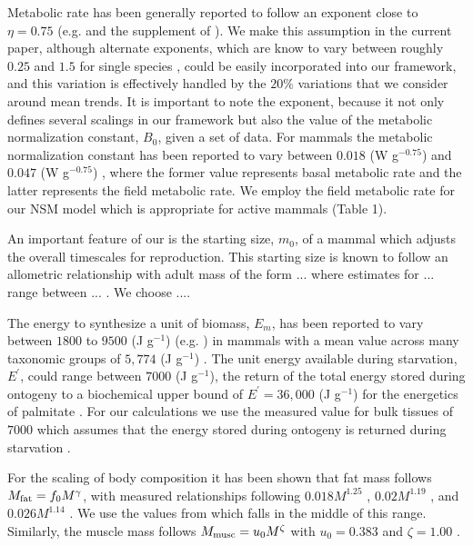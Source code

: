 \documentclass{pnastwo}
\begin{document}
\begin{article}
Metabolic rate has been generally reported to follow an exponent close to $\eta=0.75$ (e.g. \cite{West:2001bv,moses2008rmo} and the supplement of \cite{hou}). We make this assumption in the current paper, although alternate exponents, which are know to vary between roughly $0.25$ and $1.5$ for single species \cite{moses2008rmo}, could be easily incorporated into our framework, and this variation is effectively handled by the $20\%$ variations that we consider around mean trends. It is important to note the exponent, because it not only defines several scalings in our framework but also the value of the metabolic normalization constant, $B_{0}$, given a set of data.  For mammals the metabolic normalization constant has been reported to vary between $0.018$ (W g$^{-0.75}$) and $0.047$ (W g$^{-0.75}$) \cite{hou,West:2001bv}, where the former value represents basal metabolic rate and the latter represents the field metabolic rate. We employ the field metabolic rate for our NSM model which is appropriate for active mammals (Table 1).

An important feature of our is the starting size, $m_{0}$, of a mammal which adjusts the overall timescales for reproduction. This starting size is known to follow an allometric relationship with adult mass of the form ... where estimates for ... range between ... \cite{}. We choose ....

The energy to synthesize a unit of biomass, $E_{m}$, has been reported to vary between $1800$ to $9500$ (J g$^{-1}$) (e.g. \cite{West:2001bv,moses2008rmo,hou}) in mammals with a mean value across many taxonomic groups of $5,774$ (J g$^{-1}$) \cite{moses2008rmo}. The unit energy available during starvation, $E^{\prime}$, could range between $7000$ (J g$^{-1}$), the return of the total energy stored during ontogeny \cite{hou} to a biochemical upper bound of $E^{\prime}=36,000$ (J g$^{-1}$) for the energetics of palmitate \cite{stryer,hou}. For our calculations we use the measured value for bulk tissues of $7000$ which assumes that the energy stored during ontogeny is returned during starvation \cite{hou}.

For the scaling of body composition it has been shown that fat mass follows $M_{\rm fat}=f_{0}M^{\gamma}$, with measured  relationships following  $0.018M^{1.25}$ \cite{Dunbrack:1993ec}, $0.02M^{1.19}$ \cite{Lindstedt:1985hm}, and $0.026M^{1.14}$ \cite{Lindstedt:2002td}. We use the values from \cite{Lindstedt:1985hm} which falls in the middle of this range. Similarly, the muscle mass follows $M_{\rm musc}=u_{0}M^{\zeta}$ with $u_{0}=0.383$ and $\zeta=1.00$ \cite{Lindstedt:2002td}.


\end{article}
\end{document}
